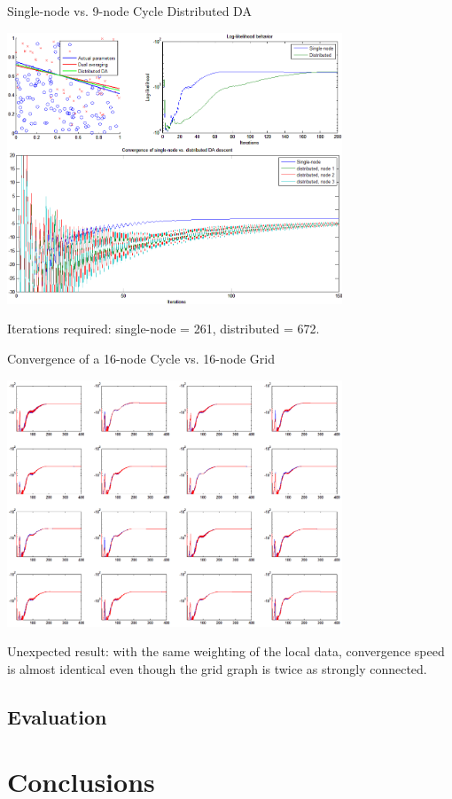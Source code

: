 \documentclass{beamer}
\begin{document}
	\begin{frame}{Single-node vs. 9-node Cycle Distributed DA}
		\centerline{\includegraphics[width=0.75\textwidth]{singlenode-vs-dist.png}}
		Iterations required: single-node = 261, distributed = 672.
	\end{frame}
	
	\begin{frame}{Convergence of a 16-node Cycle vs. 16-node Grid}
		\centerline{\includegraphics[width=0.75\textwidth]{grid-vs-cycle-ll-per-node.png}}
		Unexpected result: with the same weighting of the local data, convergence
		speed is almost identical even though the grid graph is twice as strongly 
		connected.
	\end{frame}
	
	\subsection{Evaluation}
	
	\section{Conclusions}
\end{document}
